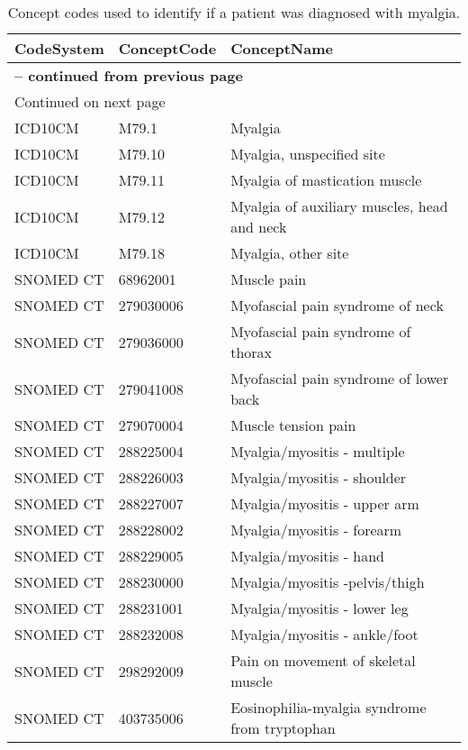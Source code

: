 \begin{longtable}{p{}p{}p{}}
\caption{Concept codes used to identify if a patient was diagnosed with myalgia.} \\ 
 CodeSystem & ConceptCode & ConceptName \\ 
  \hline 
\endfirsthead 
\multicolumn{3}{p{\textwidth}}{{ \bfseries \tablename \thetable{} -- continued from previous page}} \ 
\hline CodeSystem & ConceptCode & ConceptName \\ \hline 
\endhead 
\hline \multicolumn{3}{p{\textwidth}}{{Continued on next page}} \\ \hline 
\endfoot 
\hline 
\endlastfoot 
 \hline
ICD10CM & M79.1 & Myalgia \\ 
  ICD10CM & M79.10 & Myalgia, unspecified site \\ 
  ICD10CM & M79.11 & Myalgia of mastication muscle \\ 
  ICD10CM & M79.12 & Myalgia of auxiliary muscles, head and neck \\ 
  ICD10CM & M79.18 & Myalgia, other site \\ 
  SNOMED CT & 68962001 & Muscle pain \\ 
  SNOMED CT & 279030006 & Myofascial pain syndrome of neck \\ 
  SNOMED CT & 279036000 & Myofascial pain syndrome of thorax \\ 
  SNOMED CT & 279041008 & Myofascial pain syndrome of lower back \\ 
  SNOMED CT & 279070004 & Muscle tension pain \\ 
  SNOMED CT & 288225004 & Myalgia/myositis - multiple \\ 
  SNOMED CT & 288226003 & Myalgia/myositis - shoulder \\ 
  SNOMED CT & 288227007 & Myalgia/myositis - upper arm \\ 
  SNOMED CT & 288228002 & Myalgia/myositis - forearm \\ 
  SNOMED CT & 288229005 & Myalgia/myositis - hand \\ 
  SNOMED CT & 288230000 & Myalgia/myositis -pelvis/thigh \\ 
  SNOMED CT & 288231001 & Myalgia/myositis - lower leg \\ 
  SNOMED CT & 288232008 & Myalgia/myositis - ankle/foot \\ 
  SNOMED CT & 298292009 & Pain on movement of skeletal muscle \\ 
  SNOMED CT & 403735006 & Eosinophilia-myalgia syndrome from tryptophan \\ 

\end{longtable}
